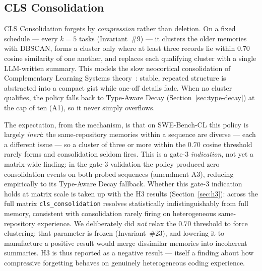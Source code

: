 
\subsection{CLS Consolidation}
\label{sec:cls}

CLS Consolidation forgets by \emph{compression} rather than deletion. On a fixed schedule
--- every $k=5$ tasks (Invariant~\#9) --- it clusters the older memories with DBSCAN, forms
a cluster only where at least three records lie within $0.70$ cosine similarity of one
another, and replaces each qualifying cluster with a single LLM-written summary. This models
the slow neocortical consolidation of Complementary Learning Systems
theory~\cite{mcclelland1995}: stable, repeated structure is abstracted into a compact gist
while one-off details fade. When no cluster qualifies, the policy falls back to Type-Aware
Decay (Section~\ref{sec:type-decay}) at the cap of ten (A1), so it never simply overflows.

The expectation, from the mechanism, is that on SWE-Bench-CL this policy is largely
\emph{inert}: the same-repository memories within a sequence are diverse --- each a different
issue --- so a cluster of three or more within the $0.70$ cosine threshold rarely forms and
consolidation seldom fires. This is a gate-3 \emph{indication}, not yet a matrix-wide finding:
in the gate-3 validation the policy produced zero consolidation events on both probed
sequences (amendment A3), reducing empirically to its Type-Aware Decay fallback. Whether this
gate-3 indication holds at matrix scale is taken up with the H3 results
(Section~\ref{sec:h3}): across the full matrix \texttt{cls\_consolidation} resolves
statistically indistinguishably from full memory, consistent with consolidation rarely firing
on heterogeneous same-repository experience. We deliberately did \emph{not} relax the $0.70$
threshold to force clustering: that parameter is frozen (Invariant~\#23), and lowering it to
manufacture a positive result would merge dissimilar memories into incoherent summaries. H3 is
thus reported as a negative result --- itself a finding about how compressive forgetting
behaves on genuinely heterogeneous coding experience.
